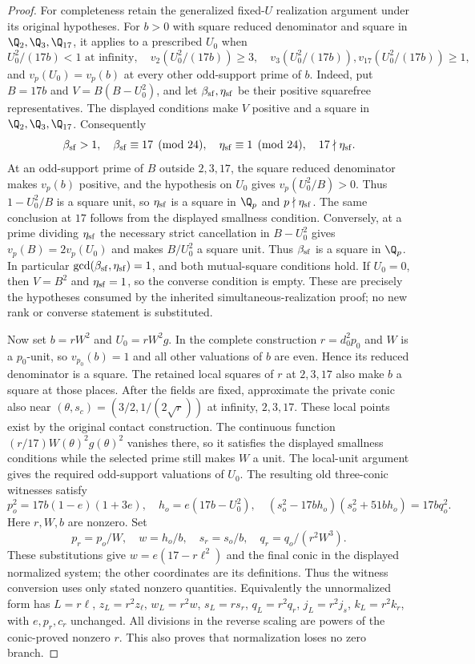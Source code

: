 \begin{proof}
For completeness retain the generalized fixed-$U$ realization argument
under its original hypotheses. For $b>0$ with square reduced denominator
and square in $\Q_2,\Q_3,\Q_{17}$, it applies to a prescribed $U_0$ when
\[
 U_0^2/(17b)<1\text{ at infinity},\quad
 v_2(U_0^2/(17b))\ge3,\quad
 v_3(U_0^2/(17b)),v_{17}(U_0^2/(17b))\ge1,
\]
and $v_p(U_0)=v_p(b)$ at every other odd-support prime of $b$.
Indeed, put $B=17b$ and $V=B(B-U_0^2)$, and let
$\beta_{\rm sf},\eta_{\rm sf}$ be their positive squarefree representatives.
The displayed conditions make $V$ positive and a square in
$\Q_2,\Q_3,\Q_{17}$. Consequently
\[
 \beta_{\rm sf}>1,\quad \beta_{\rm sf}\equiv17\pmod{24},\quad
 \eta_{\rm sf}\equiv1\pmod{24},\quad 17\nmid\eta_{\rm sf}.
\]
At an odd-support prime of $B$ outside $2,3,17$, the square reduced
denominator makes $v_p(b)$ positive, and the hypothesis on $U_0$ gives
$v_p(U_0^2/B)>0$. Thus $1-U_0^2/B$ is a square unit, so
$\eta_{\rm sf}$ is a square in $\Q_p$ and $p\nmid\eta_{\rm sf}$.
The same conclusion at $17$ follows from the displayed smallness condition.
Conversely, at a prime dividing $\eta_{\rm sf}$ the necessary strict
cancellation in $B-U_0^2$ gives $v_p(B)=2v_p(U_0)$ and makes
$B/U_0^2$ a square unit. Thus $\beta_{\rm sf}$ is a square in $\Q_p$.
In particular $\gcd(\beta_{\rm sf},\eta_{\rm sf})=1$, and both
mutual-square conditions hold. If $U_0=0$, then $V=B^2$ and
$\eta_{\rm sf}=1$, so the converse condition is empty. These are precisely
the hypotheses consumed by the inherited simultaneous-realization proof;
no new rank or converse statement is substituted.

Now set $b=rW^2$ and $U_0=rW^2g$. In the complete construction
$r=d_0^2p_0$ and $W$ is a $p_0$-unit, so $v_{p_0}(b)=1$ and all
other valuations of $b$ are even. Hence its reduced denominator is a
square. The retained local squares of $r$ at $2,3,17$ also make $b$ a
square at those places. After the fields are fixed, approximate
the private conic also near $(\theta,s_c)=(3/2,1/(2\sqrt r))$ at infinity,
$2,3,17$. These local points exist by the original contact construction.
The continuous function $(r/17)W(\theta)^2g(\theta)^2$ vanishes there,
so it satisfies the displayed smallness conditions while the selected
prime still makes $W$ a unit. The local-unit argument gives the required
odd-support valuations of $U_0$. The resulting old three-conic witnesses satisfy
\[
 p_o^2=17b(1-e)(1+3e),\quad h_o=e(17b-U_0^2),\quad
 (s_o^2-17bh_o)(s_o^2+51bh_o)=17bq_o^2.
\]
Here $r,W,b$ are nonzero. Set
\[
 p_r=p_o/W,\quad w=h_o/b,\quad
 s_r=s_o/b,\quad q_r=q_o/(r^2W^3).
\]
These substitutions give $w=e(17-r\ell^2)$ and the final conic in the
displayed normalized system; the other coordinates are its definitions.
Thus the witness conversion uses only stated nonzero quantities.
Equivalently the unnormalized form
has $L=r\ell$, $z_L=r^2z_\ell$, $w_L=r^2w$, $s_L=rs_r$,
$q_L=r^2q_r$, $j_L=r^2j_s$, $k_L=r^2k_r$, with $e,p_r,c_r$ unchanged.
All divisions in the reverse scaling are powers of the conic-proved
nonzero $r$. This also proves that normalization loses no zero branch.
\end{proof}

